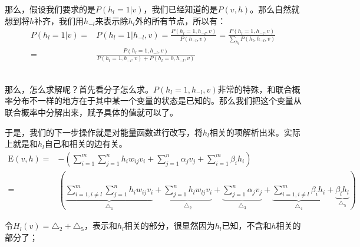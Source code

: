 \documentclass[a4paper]{article}
\begin{document}
那么，假设我们要求的是$P(h_l=1|v)$，我们已经知道的是$P(v,h)$。那么自然就想到将$h$补齐，我们用$h_{-l}$来表示除$h_l$外的所有节点，所以有：
\begin{equation*}
    \begin{split}
        P(h_l=1|v) = & P(h_l=1|h_{-l},v) = \frac{P(h_l=1,h_{-l},v)}{P(h_{-l},v)} = \frac{P(h_l=1,h_{-l},v)}{\sum_{h_l} P(h_l,h_{-l},v)} \\
        = & \frac{P(h_l=1,h_{-l},v)}{P(h_l=1,h_{-l},v)+P(h_l=0,h_{-l},v)}
    \end{split}
\end{equation*}

~\\

那么，怎么求解呢？首先看分子怎么求。$P(h_l=1,h_{-l},v)$非常的特殊，和联合概率分布不一样的地方在于其中某一个变量的状态是已知的。那么我们把这个变量从联合概率中分解出来，赋予具体的值就可以了。

于是，我们的下一步操作就是对能量函数进行改写，将$h_l$相关的项解析出来。实际上就是和$h_l$自己和相关的边有关。
\begin{equation}
\begin{split}
    \mathrm{E}(v,h)= & - \left( \sum_{i=1}^m \sum_{j=1}^n h_iw_{ij}v_i + \sum_{j=1}^n \alpha_j v_j + \sum_{i=1}^m \beta_i h_i \right)  \\
    = & \left( \underbrace{\sum_{i=1,i\neq l}^m \sum_{j=1}^n h_iw_{ij}v_i}_{\triangle_1} + \underbrace{\sum_{j=1}^n h_lw_{lj}v_i}_{\triangle_2} + \underbrace{\sum_{j=1}^n \alpha_j v_j}_{\triangle_3} + \underbrace{\sum_{i=1,i\neq l}^m \beta_i h_i}_{\triangle_4} +\underbrace{ \beta_l h_l }_{\triangle_5} \right)  
\end{split}
\end{equation}

令$H_l(v)=\triangle_2+\triangle_5$，表示和$h_l$相关的部分，很显然因为$h_l$已知，不含和$h$相关的部分了；
\end{document}
